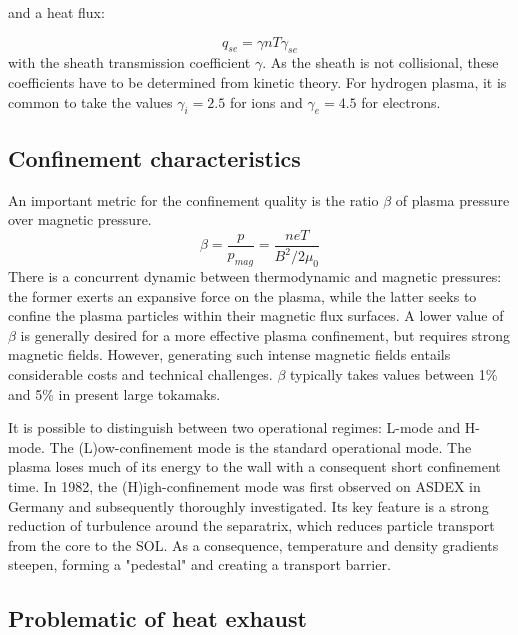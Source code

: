 and a heat flux:

\begin{equation}
	q_{se} = \gamma n T \gamma_{se}
\end{equation}
with the sheath transmission coefficient $\gamma$. As the sheath is not collisional, these coefficients have to be determined from kinetic theory\cite{Stangeby_2000}. For hydrogen plasma, it is common to take the values $\gamma_i = 2.5$ for ions and $\gamma_e = 4.5$ for electrons.




\subsection{Confinement characteristics}
An important metric for the confinement quality is the ratio $\beta$ of plasma pressure over magnetic pressure.
\begin{equation}
	\label{eq:PlasmaBeta}
	\beta = \frac{p}{p_{mag}} = \frac{neT}{B^2/2\mu_0}
\end{equation}
There is a concurrent dynamic between thermodynamic and magnetic pressures: the former exerts an expansive force on the plasma, while the latter seeks to confine the plasma particles within their magnetic flux surfaces. A lower value of $\beta$ is generally desired for a more effective plasma confinement, but requires strong magnetic fields. However, generating such intense magnetic fields entails considerable costs and technical challenges. $\beta$ typically takes values between 1\% and 5\% in present large tokamaks. 

It is possible to distinguish between two operational regimes: L-mode and H-mode. The (L)ow-confinement mode is the standard operational mode. The plasma loses much of its energy to the wall with a consequent short confinement time. In 1982, the (H)igh-confinement mode was first observed on ASDEX in Germany and subsequently thoroughly investigated\cite{asdex1989h}. Its key feature is a strong reduction of turbulence around the separatrix, which reduces particle transport from the core to the SOL. As a consequence, temperature and density gradients steepen, forming a "pedestal" and creating a transport barrier. 

\subsection{Problematic of heat exhaust}

